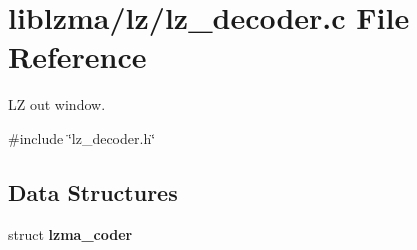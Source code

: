 \section{liblzma/lz/lz\+\_\+decoder.c File Reference}
\label{lz__decoder_8c}


LZ out window.  


{\ttfamily \#include \char`\"{}lz\+\_\+decoder.\+h\char`\"{}}\newline
\subsection*{Data Structures}
\begin{DoxyCompactItemize}
\item 
struct \textbf{ lzma\+\_\+coder}
\end{DoxyCompactItemize}
